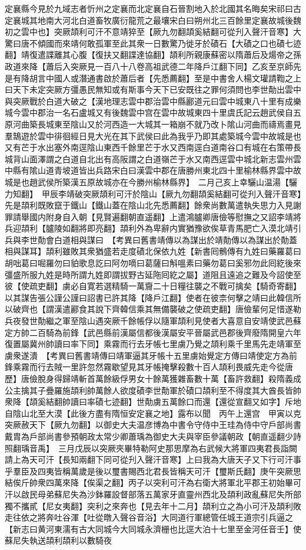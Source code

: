 定襄縣今見於九域志者忻州之定襄而北定襄自石晉割地入於北國其名晦矣宋祁曰古定襄城其地南大河北白道畜牧廣衍龍荒之最壤宋白曰朔州北三百餘里定襄故城後魏初之雲中也】突厥頡利可汗不意靖猝至【厥九勿翻頡奚結翻可從刋入聲汗音寒】大驚曰唐不傾國而來靖何敢孤軍至此其衆一日數驚乃徙牙於磧石【大磧之口也磧七迹翻】靖復遣諜離其心腹【復扶又翻諜達協翻】頡利所親康蘇密以隋蕭后及煬帝之孫政道來降【蕭后入突厥見一百八十八卷高祖武德二年降戶江翻下同】乙亥至京師先是有降胡言中國人或潛通書啟於蕭后者【先悉薦翻】至是中書舍人楊文瓘請鞫之上曰天下未定突厥方彊愚民無知或有斯事今天下已安既往之罪何須問也李世勣出雲中與突厥戰於白道大破之【漢地理志雲中郡治雲中縣酈道元曰雲中城東八十里有成樂城今雲中郡治一名石盧城又有後魏雲中宫在雲中故城東四十里虞氏記云趙武侯自五原河曲築長城東至陰山又於河西造一大城其一箱崩不就乃改卜隂山河曲而禱焉畫見羣鵠遊於雲中徘徊經日見大光在其下武侯曰此為我乎乃即其處築城今雲中故城是也又有芒于水出塞外南逕陰山東西千餘里芒于水又西南逕白道南谷口有城在右策帶長城背山面澤謂之白道自北出有高阪謂之白道嶺芒于水又南西逕雲中城北新志雲州雲中縣有隂山道青坡道皆出兵路宋白曰漢雲中郡在唐勝州東北四十里榆林縣界雲中故城是也趙武侯所築漢五原故城亦在今勝州榆林縣界】　二月己亥上幸驪山温湯【驪力知翻】　甲辰李靖破突厥頡利可汗於陰山【厥九勿翻頡奚結翻可從刋入聲汗音寒】先是頡利既敗竄于鐵山【鐵山蓋在陰山北先悉薦翻】餘衆尚數萬遣執失思力入見謝罪請舉國内附身自入朝【見賢遍翻朝直遥翻】上遣鴻臚卿唐儉等慰撫之又詔李靖將兵迎頡利【臚陵如翻將即亮翻】頡利外為卑辭内實猶豫欲俟草青馬肥亡入漠北靖引兵與李世勣會白道相與謀曰　【考異曰舊書靖傳以為謀出於靖勣傳以為謀出於勣蓋相與謀耳】頡利雖敗其衆猶盛若走度磧北保依九姓【新書囘鶻傳有九姓曰藥羅葛曰胡咄葛曰啒羅勿曰貃歌息訖曰阿勿嘀曰葛薩曰斛嗢素曰藥勿葛曰奚邪勿此囘紇後來彊盛所服九姓是時所謂九姓即謂拔野古延陁囘紇之屬】道阻且遠追之難及今詔使至彼【使疏吏翻】虜必自寛若選精騎一萬齎二十日糧往襲之不戰可擒矣【騎奇寄翻】以其謀告張公謹公謹曰詔書已許其降【降戶江翻】使者在彼柰何擊之靖曰此韓信所以破齊也【謂漢遣酈食其說下齊韓信乘其無備襲破之使疏吏翻】唐儉輩何足惜遂勒兵夜發世勣繼之軍至陰山遇突厥千餘帳俘以隨軍頡利見使者大喜意自安靖使武邑蘇定方帥二百騎為前鋒【武邑縣前漢屬信都後漢屬安平晉屬武邑郡後齊廢隋開皇六年復置屬冀州帥讀曰率下同】乘霧而行去牙帳七里虜乃覺之頡利乘千里馬先走靖軍至虜衆遂潰　【考異曰舊書靖傳曰靖軍逼其牙帳十五里虜始覺定方傳曰靖使定方為前鋒乘霧而行去賊一里許忽然霧歇望見其牙帳掩擊殺數十百人頡利畏威先走今從唐歷】唐儉脫身得歸靖斬首萬餘級俘男女十餘萬獲雜畜數十萬【畜許救翻】殺隋義成公主擒其子疊羅施頡利帥萬餘人欲度磧李世勣軍於磧口頡利至不得度其大酋長皆帥衆降【頡奚結翻帥讀曰率磧七迹翻】世勣虜五萬餘口而還【還從宣翻又如字】斥地自陰山北至大漠【此後方盡有隋恒安定襄之地】露布以聞　丙午上還宫　甲寅以克突厥赦天下【厥九勿翻】以御史大夫温彦博為中書令守侍中王珪為侍中守戶部尚書戴胄為戶部尚書參預朝政太常少卿蕭瑀為御史大夫與宰臣參議朝政【朝直遥翻少詩照翻瑀音禹】　三月戊辰以突厥夾畢特勒阿史那思摩為右武候大將軍四夷君長詣闕請上為天可汗【長知兩翻下同可從刋入聲汗音寒】上曰我為大唐天子又下行可汗事乎羣臣及四夷皆稱萬歲是後以璽書賜西北君長皆稱天可汗【璽斯氏翻】庚午突厥思結俟斤帥衆四萬來降【俟渠之翻】丙子以突利可汗為右衛大將軍北平郡王初始畢可汗以啟民母弟蘇尼失為沙鉢羅設督部落五萬家牙直靈州西北及頡利政亂蘇尼失所部獨不攜貳【尼女夷翻】突利之來奔也【見去年十二月】頡利立之為小可汗及頡利敗走往依之將奔吐谷渾【吐從暾入聲谷音浴】大同道行軍總管任城王道宗引兵逼之【新志曰黄河東濡有古大同城今大同城永濟栅也比逕大泊十七里至金河任音壬】使蘇尼失執送頡利頡利以數騎夜